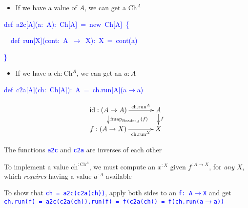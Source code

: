 \texttt{\textcolor{blue}{\footnotesize{}}}%
\begin{minipage}[t]{0.65\textwidth}%
\begin{itemize}
\item If we have a value of $A$, we can get a $\text{Ch}^{A}$
\end{itemize}
\begin{lyxcode}
\textcolor{blue}{\footnotesize{}def~a2c{[}A{]}(a:~A):~Ch{[}A{]}~=~new~Ch{[}A{]}~\{~}{\footnotesize\par}

\textcolor{blue}{\footnotesize{}~~def~run{[}X{]}(cont:~A~$\rightarrow$~X):~X~=~cont(a)}{\footnotesize\par}

\textcolor{blue}{\footnotesize{}\}}{\footnotesize\par}
\end{lyxcode}
\begin{itemize}
\item If we have a $\text{ch}:\text{Ch}^{A}$, we can get an $a:A$ 
\end{itemize}
\begin{lyxcode}
\textcolor{blue}{\footnotesize{}def~c2a{[}A{]}(ch:~Ch{[}A{]}):~A~=~ch.run{[}A{]}(a$\rightarrow$a)}{\footnotesize\par}
\end{lyxcode}
%
\end{minipage}\texttt{\textcolor{blue}{\footnotesize{}\hfill{}}}%
\begin{minipage}[t]{0.3\columnwidth}%
{\footnotesize{}
\[
\xymatrix{\xyScaleY{1pc}\xyScaleX{3pc}\text{id}:\left(A\rightarrow A\right)\ar[r]\sp(0.65){\text{ch}.\text{run}^{A}}\ar[d]\sp(0.5){\text{fmap}_{\text{Reader}_{A}}\left(f\right)} & A\ar[d]\sp(0.45){f}\\
f:\left(A\rightarrow X\right)\ar[r]\sb(0.65){\text{ch}.\text{run}^{X}} & X
}
\]
}%
\end{minipage}\texttt{\textcolor{blue}{\footnotesize{}\hfill{}}}{\footnotesize\par}

The functions \texttt{\textcolor{blue}{\footnotesize{}a2c}} and \texttt{\textcolor{blue}{\footnotesize{}c2a}}
are inverses of each other

To implement a value $\text{ch}^{:\text{Ch}^{A}}$, we must compute
an $x^{:X}$ given $f^{:A\rightarrow X}$, for \emph{any} $X$, which
\emph{requires} having a value $a^{:A}$ available

To show that \texttt{\textcolor{blue}{\footnotesize{}ch = a2c(c2a(ch))}},
apply both sides to an \texttt{\textcolor{blue}{\footnotesize{}f:~A$\rightarrow$X}}
and get \texttt{\textcolor{blue}{\footnotesize{}ch.run(f) = a2c(c2a(ch)).run(f)
= f(c2a(ch)) = f(ch.run(a$\rightarrow$a))}} 

